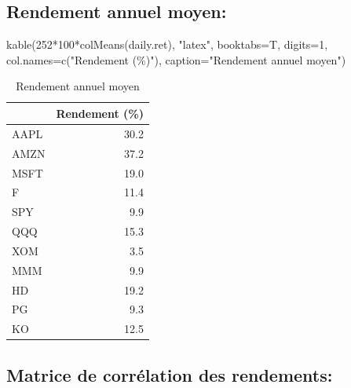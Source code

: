 \documentclass[
]{article}
\newenvironment{Shaded}{\begin{snugshade}}{\end{snugshade}}
\newcommand{\AttributeTok}[1]{\textcolor[rgb]{0.77,0.63,0.00}{#1}}
\newcommand{\DecValTok}[1]{\textcolor[rgb]{0.00,0.00,0.81}{#1}}
\newcommand{\FunctionTok}[1]{\textcolor[rgb]{0.00,0.00,0.00}{#1}}
\newcommand{\NormalTok}[1]{#1}
\newcommand{\SpecialCharTok}[1]{\textcolor[rgb]{0.00,0.00,0.00}{#1}}
\newcommand{\StringTok}[1]{\textcolor[rgb]{0.31,0.60,0.02}{#1}}
\begin{document}
\hypertarget{rendement-annuel-moyen}{%
\subsection{Rendement annuel moyen:}\label{rendement-annuel-moyen}}

\begin{Shaded}
\begin{Highlighting}[]
\FunctionTok{kable}\NormalTok{(}\DecValTok{252}\SpecialCharTok{*}\DecValTok{100}\SpecialCharTok{*}\FunctionTok{colMeans}\NormalTok{(daily.ret), }\StringTok{"latex"}\NormalTok{, }\AttributeTok{booktabs=}\NormalTok{T, }\AttributeTok{digits=}\DecValTok{1}\NormalTok{, }\AttributeTok{col.names=}\FunctionTok{c}\NormalTok{(}\StringTok{"Rendement (\%)"}\NormalTok{),}
      \AttributeTok{caption=}\StringTok{"Rendement annuel moyen"}\NormalTok{)}
\end{Highlighting}
\end{Shaded}

\begin{table}

\caption{\label{tab:unnamed-chunk-2}Rendement annuel moyen}
\centering
\begin{tabular}[t]{lr}
\toprule
  & Rendement (\%)\\
\midrule
AAPL & 30.2\\
AMZN & 37.2\\
MSFT & 19.0\\
F & 11.4\\
SPY & 9.9\\
\addlinespace
QQQ & 15.3\\
XOM & 3.5\\
MMM & 9.9\\
HD & 19.2\\
PG & 9.3\\
\addlinespace
KO & 12.5\\
\bottomrule
\end{tabular}
\end{table}

\hypertarget{matrice-de-corruxe9lation-des-rendements}{%
\subsection{Matrice de corrélation des
rendements:}\label{matrice-de-corruxe9lation-des-rendements}}
\end{document}
